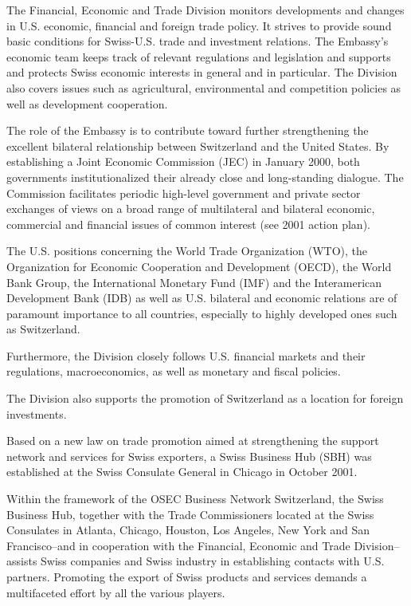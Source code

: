 \documentclass[a4paper]{article}
\begin{document}

The Financial, Economic and Trade Division monitors developments and changes in U.S. economic, financial
and foreign trade policy. It strives to provide sound basic conditions for Swiss-U.S. trade and
investment relations. The Embassy's economic team keeps track of relevant regulations and legislation
and supports and protects Swiss economic interests in general and in particular. The Division also
covers issues such as agricultural, environmental and competition policies as well as development
cooperation.

The role of the Embassy is to contribute toward further strengthening the excellent bilateral
relationship between Switzerland and the United States. By establishing a Joint Economic
Commission (JEC) in January 2000, both governments institutionalized their already close and
long-standing dialogue. The Commission facilitates periodic high-level government and private sector
exchanges of views on a broad range of multilateral and bilateral economic, commercial and financial
issues of common interest (see 2001 action plan).

The U.S. positions concerning the World Trade Organization (WTO), the Organization for Economic
Cooperation and Development (OECD), the World Bank Group, the International Monetary Fund (IMF)
and the Interamerican Development Bank (IDB) as well as U.S. bilateral and economic relations
are of paramount importance to all countries, especially to highly developed ones such as Switzerland.

Furthermore, the Division closely follows U.S. financial markets and their regulations, macroeconomics,
as well as monetary and fiscal policies.

The Division also supports the promotion of Switzerland as a location for foreign investments.

Based on a new law on trade promotion aimed at strengthening the support network and services for
Swiss exporters, a Swiss Business Hub (SBH) was established at the Swiss Consulate General in Chicago
in October 2001.

Within the framework of the OSEC Business Network Switzerland, the Swiss Business Hub, together with
the Trade Commissioners located at the Swiss Consulates in Atlanta, Chicago, Houston, Los Angeles,
New York and San Francisco--and in cooperation with the Financial, Economic and Trade Division--assists
Swiss companies and Swiss industry in establishing contacts with U.S. partners. Promoting the export
of Swiss products and services demands a multifaceted effort by all the various players.
\end{document}

